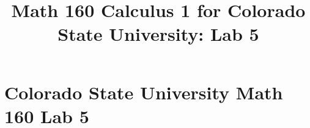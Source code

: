 \documentclass[10pt,handout,twocolumn,twoside,wordchoicegiven]{xourse}
\title{Math 160 Calculus 1 for Colorado State University: Lab 5}
\begin{document}
\maketitle

\setcounter{tocdepth}{2}


\part{Colorado State University Math 160 Lab 5}


\chapterstyle
\begin{graded}{0}
\end{graded}
\sectionstyle
\begin{graded}{26}
\end{graded}

%
%
%
%
\end{document}
